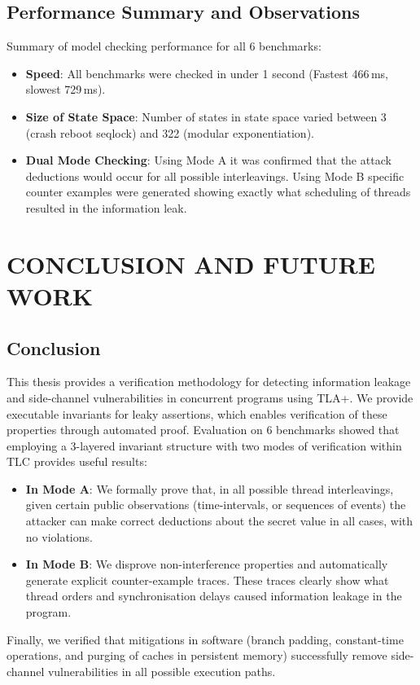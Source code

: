 \documentclass[a4paper,12pt]{report}
\begin{document}
\section{Performance Summary and Observations}
Summary of model checking performance for all 6 benchmarks:
\begin{itemize}[itemsep=0.15em, topsep=0.1em]
    \item \textbf{Speed}: All benchmarks were checked in under 1 second (Fastest 466\,ms, slowest 729\,ms).
    \item \textbf{Size of State Space}: Number of states in state space varied between 3 (crash reboot seqlock) and 322 (modular exponentiation).
    \item \textbf{Dual Mode Checking}: Using Mode A it was confirmed that the attack deductions would occur for all possible interleavings. Using Mode B specific counter examples were generated showing exactly what scheduling of threads resulted in the information leak.
\end{itemize}

\chapter{CONCLUSION AND FUTURE WORK}
\enlargethispage{1.5\baselineskip}

\section{Conclusion}
This thesis provides a verification methodology for detecting information leakage and side-channel vulnerabilities in concurrent programs using TLA+. We provide executable invariants for leaky assertions, which enables verification of these properties through automated proof. Evaluation on 6 benchmarks showed that employing a 3-layered invariant structure with two modes of verification within TLC provides useful results:
\begin{itemize}[itemsep=0.12em, topsep=0.1em]
    \item \textbf{In Mode A}: We formally prove that, in all possible thread interleavings, given certain public observations (time-intervals, or sequences of events) the attacker can make correct deductions about the secret value in all cases, with no violations.
    \item \textbf{In Mode B}: We disprove non-interference properties and automatically generate explicit counter-example traces. These traces clearly show what thread orders and synchronisation delays caused information leakage in the program.
\end{itemize}
Finally, we verified that mitigations in software (branch padding, constant-time operations, and purging of caches in persistent memory) successfully remove side-channel vulnerabilities in all possible execution paths.
\end{document}
